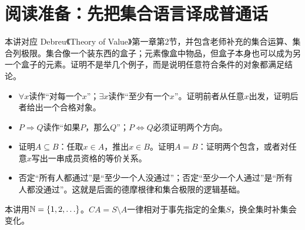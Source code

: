 \section*{阅读准备：先把集合语言译成普通话}
本讲对应 Debreu《Theory of Value》第一章第2节，并包含老师补充的集合运算、集合列极限。集合像一个装东西的盒子；元素像盒中物品，但盒子本身也可以成为另一个盒子的元素。证明不是举几个例子，而是说明任意符合条件的对象都满足结论。
\begin{itemize}
\item $\forall x$读作“对每一个$x$”；$\exists x$读作“至少有一个$x$”。证明前者从任意$x$出发，证明后者给出一个合格对象。
\item $P\Rightarrow Q$读作“如果$P$，那么$Q$”；$P\Leftrightarrow Q$必须证明两个方向。
\item 证明$A\subseteq B$：任取$x\in A$，推出$x\in B$。证明$A=B$：证明两个包含，或者对任意$x$写出一串成员资格的等价关系。
\item 否定“所有人都通过”是“至少一个人没通过”；否定“至少一个人通过”是“所有人都没通过”。这就是后面的德摩根律和集合极限的逻辑基础。
\end{itemize}
本讲用$\mathbb{N}=\{1,2,\ldots\}$。$C A=S\setminus A$一律相对于事先指定的全集$S$，换全集时补集会变化。

